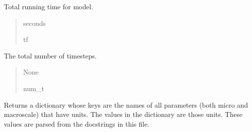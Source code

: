 \documentclass[letterpaper,10pt,english]{sphinxmanual}
\begin{document}
\begin{fulllineitems}
\begin{fulllineitems}
\label{\detokenize{lysis.util:lysis.util.parameters.MacroParameters.total_time}}
\pysigstartsignatures
{}
\pysigstopsignatures
\sphinxAtStartPar
Total running time for model.
\begin{quote}\begin{description}
\sphinxAtStartPar
seconds

\sphinxAtStartPar
tf

\end{description}\end{quote}

\end{fulllineitems}


\begin{fulllineitems}
\label{\detokenize{lysis.util:lysis.util.parameters.MacroParameters.total_time_steps}}
\pysigstartsignatures
{}
\pysigstopsignatures
\sphinxAtStartPar
The total number of timesteps.
\begin{quote}\begin{description}
\sphinxAtStartPar
None

\sphinxAtStartPar
num\_t

\end{description}\end{quote}

\end{fulllineitems}


\begin{fulllineitems}
\label{\detokenize{lysis.util:lysis.util.parameters.MacroParameters.units}}
\pysigstartsignatures
{}
\pysigstopsignatures
\sphinxAtStartPar
Returns a dictionary whose keys are the names of all parameters (both micro\sphinxhyphen{} and macroscale)
that have units. The values in the dictionary are those units.
These values are parsed from the docstrings in this file.


\end{fulllineitems}
\end{fulllineitems}
\end{document}
